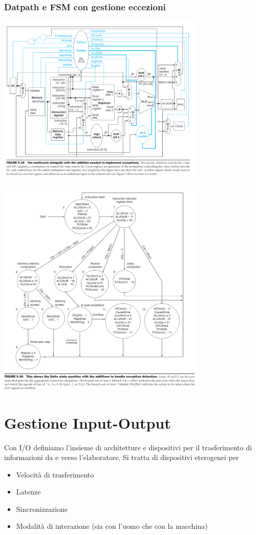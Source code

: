 \documentclass[12pt, a4paper, openany]{book}
\begin{document}
\subsection{Datpath e FSM con gestione eccezioni}
\begin{center}
    \includegraphics[width=100mm, scale=0.5]{Datapath exception.png}
\end{center}
\begin{center}
    \includegraphics[width=100mm, scale=0.5]{Automa Exception.png}
\end{center}



\chapter{Gestione Input-Output}
Con I/O definiamo l'insieme di architetture e dispositivi per il trasferimento di informazioni da 
e verso l'elaboratore. Si tratta di dispositivi eterogenei per
\begin{itemize}
    \item Velocità di trasferimento
    \item Latenze
    \item Sincronizzazione
    \item Modalità di interazione (sia con l'uomo che con la macchina)
\end{itemize}
\end{document}
